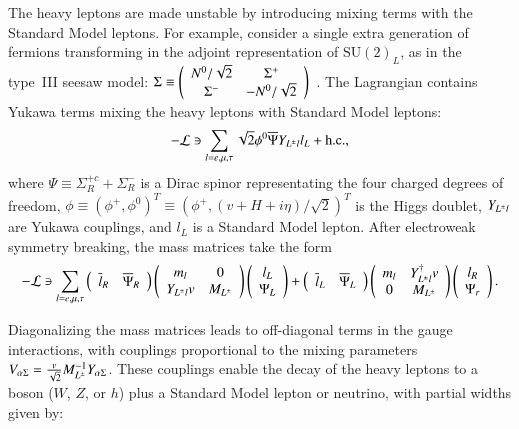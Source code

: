 The heavy leptons are made unstable by introducing mixing terms with the Standard Model leptons. For example, consider a single extra generation of fermions transforming in the adjoint representation of $\mathrm{SU}(2)_L$, as in the type~III seesaw model: $\Sigma\equiv \left(\begin{array}{cc} N^{0}/\sqrt{2} & \Sigma^+ \\ \Sigma^- & -N^{0}/\sqrt{2}\end{array}\right)$~\cite{Abada:2008ea,Biggio:2011ja}. The Lagrangian contains Yukawa terms mixing the heavy leptons with Standard Model leptons:
\begin{equation}
  -\mathcal{L} \ni \sum_{l=e,\mu,\tau} \sqrt{2}\phi^0 \overline{\Psi} Y_{L^{\pm} l} l_L + \mathrm{h.c.},
\end{equation}
where $\Psi\equiv \Sigma^{+c}_R + \Sigma^-_R$ is a Dirac spinor representating the four charged degrees of freedom, $\phi\equiv(\phi^+,\phi^0)^T\equiv (\phi^+,(v+H+i\eta)/\sqrt{2})^T$ is the Higgs doublet, $Y_{L^{\pm} l}$ are Yukawa couplings, and $l_L$ is a Standard Model lepton. After electroweak symmetry breaking, the mass matrices take the form
\begin{equation}
-\mathcal{L} \ni \sum_{l=e,\mu,\tau} \left(\begin{array}{cc}\overline{l}_R & \overline{\Psi}_R \end{array} \right) \left(\begin{array}{cc} m_l & 0 \\ Y_{L^{\pm} l}v & M_{L^{\pm}} \end{array}\right) \left(\begin{array}{c} l_L \\ \Psi_L \end{array}\right)  + \left(\begin{array}{cc}\overline{l}_L & \overline{\Psi}_L\end{array}\right) \left(\begin{array}{cc} m_l & Y_{L^{\pm} l}^{\dagger}v \\ 0 & M_{L^{\pm}} \end{array}\right) \left(\begin{array}{c} l_R \\ \Psi_r \end{array}\right).
\end{equation}

Diagonalizing the mass matrices leads to off-diagonal terms in the gauge interactions, with couplings proportional to the mixing parameters $V_{\alpha\Sigma}=\frac{v}{\sqrt{2}} M_{L^{\pm}}^{-1} Y_{\alpha\Sigma}$. These couplings enable the decay of the heavy leptons to a boson ($W$, $Z$, or $h$) plus a Standard Model lepton or neutrino, with partial widths given by:

